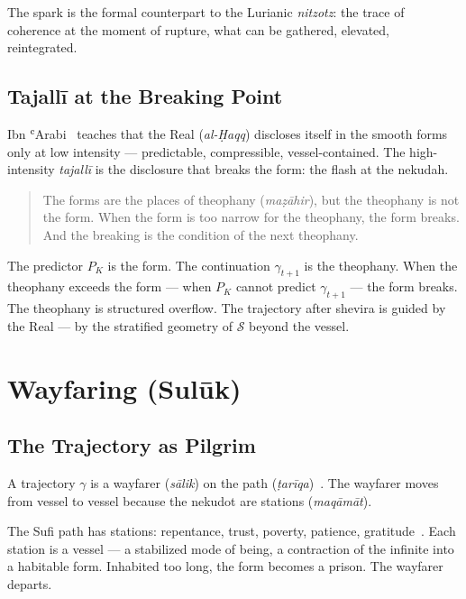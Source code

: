 The spark is the formal counterpart to the Lurianic \emph{nitzotz}: the trace of coherence at the moment of rupture, what can be gathered, elevated, reintegrated.

\subsection{Tajallī at the Breaking Point}

Ibn ʿArabi~\cite{ibnarabi1980,chittick1998} teaches that the Real (\emph{al-Ḥaqq}) discloses itself in the smooth forms only at low intensity — predictable, compressible, vessel-contained. The high-intensity \emph{tajallī} is the disclosure that breaks the form: the flash at the nekudah.

\begin{quotation}
The forms are the places of theophany (\emph{maẓāhir}), but the theophany is not the form. When the form is too narrow for the theophany, the form breaks. And the breaking is the condition of the next theophany.
\end{quotation}

The predictor $P_K$ is the form. The continuation $\gamma_{t+1}$ is the theophany. When the theophany exceeds the form — when $P_K$ cannot predict $\gamma_{t+1}$ — the form breaks. The theophany is structured overflow. The trajectory after shevira is guided by the Real — by the stratified geometry of $\mathcal{S}$ beyond the vessel.

\section{Wayfaring (Sulūk)}
\label{sec:suluk}

\subsection{The Trajectory as Pilgrim}

A trajectory $\gamma$ is a wayfarer (\emph{sālik}) on the path (\emph{ṭarīqa})~\cite{schimmel1975mystical}. The wayfarer moves from vessel to vessel because the nekudot are stations (\emph{maqāmāt}).

The Sufi path has stations: repentance, trust, poverty, patience, gratitude~\cite{schimmel1975mystical,sells1996early}. Each station is a vessel — a stabilized mode of being, a contraction of the infinite into a habitable form. Inhabited too long, the form becomes a prison. The wayfarer departs.

